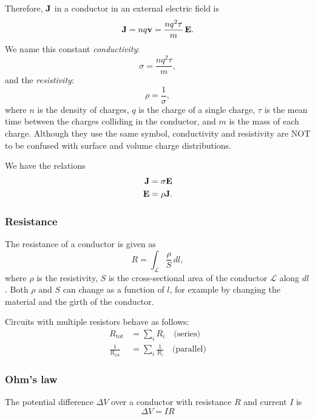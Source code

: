         Therefore, $\mathbf{J}$ in a conductor in an external electric field is
        \begin{equation}
            \mathbf{J} = nq\mathbf{v} = \frac{nq^2\tau}{m}\,\mathbf{E}.
        \end{equation}
        We name this constant \textit{conductivity}: 
        \begin{equation}
            \sigma = \frac{nq^2\tau}{m},
        \end{equation}
        and the \textit{resistivity}:
        \begin{equation}
            \rho = \frac{1}{\sigma},
        \end{equation}
        where $n$ is the density of charges, $q$ is the charge of a single charge, 
        $\tau$ is the mean time between the charges colliding in the conductor, and $m$ is the mass of each charge. 
        Although they use the same symbol, conductivity and resistivity are NOT to be confused with surface and volume charge distributions.
        
        We have the relations 
        \begin{align}
            \label{j eq sigma E}
            \mathbf{J} &= \sigma \mathbf{E} \\
            \mathbf{E} &= \rho \mathbf{J}.
        \end{align}
    
    \subsubsection{Resistance}
        The resistance of a conductor is given as
        \begin{equation}
            R = \int_\mathcal{L} \frac{\rho}{S}\, dl,
        \end{equation}
        where $\rho$ is the resistivity, 
        $S$ is the cross-sectional area of the conductor $\mathcal{L}$ along $dl$. 
        Both $\rho$ and $S$ can change as a function of $l$, for example by changing the material and the girth of the conductor.
        
        Circuits with multiple resistors behave as follows: 
        \begin{align}
            R_{\text{tot}} &= \sum_i R_i\quad \text{(series)} \\
            \frac{1}{R_{\text{tot}}} &= \sum_i \frac{1}{R_i} \quad\text{(parallel)}
        \end{align}
        
    \subsubsection{Ohm's law}
        The potential difference $\Delta V$ over a conductor with resistance $R$ and current $I$ is
        \begin{equation}
            \Delta V = IR
        \end{equation}
        
